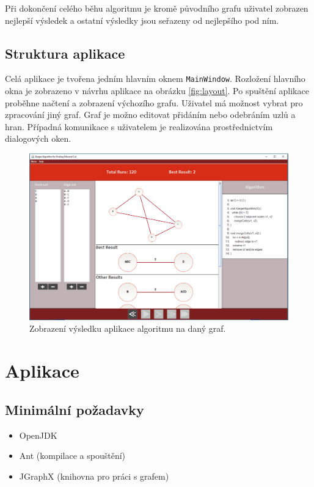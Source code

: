 \documentclass[../projekt.tex]{subfiles}
\begin{document}
Při dokončení celého běhu algoritmu je kromě původního grafu uživatel zobrazen nejlepší výsledek a ostatní výsledky
jsou seřazeny od nejlepšího pod ním.

\subsection{Struktura aplikace}

Celá aplikace je tvořena jedním hlavním oknem \texttt{MainWindow}. Rozložení hlavního okna
je zobrazeno v návrhu aplikace na obrázku \ref{fig:layout}. Po spuštění aplikace
proběhne načtení a zobrazení výchozího grafu. Uživatel má možnost vybrat pro
zpracování jiný graf. Graf je možno editovat přidáním nebo odebráním uzlů a hran.
Případná komunikace s uživatelem je realizována prostřednictvím dialogových oken. 


	\begin{figure}[ht]
    	\begin{center}
  			\includegraphics[scale=0.4]{obrazky-figures/finish.png}
  			\caption{Zobrazení výsledku aplikace algoritmu na daný graf.}
  		\end{center}
	\end{figure}


\section{Aplikace}

\subsection{Minimální požadavky}

\begin{itemize}
	\item OpenJDK
	\item Ant (kompilace a spouštění)
	\item JGraphX (knihovna pro práci s grafem)
\end{itemize}
\end{document}
